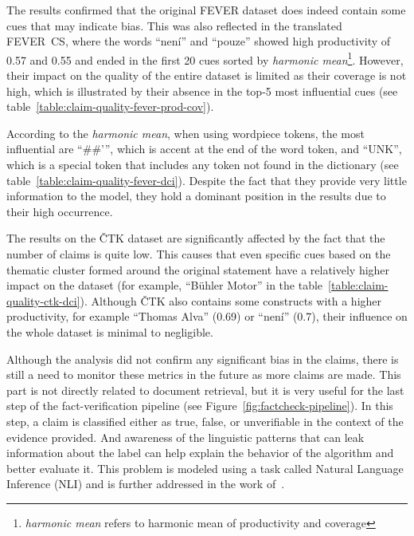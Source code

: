     The results confirmed that the original FEVER dataset does indeed contain some cues that may indicate bias. This was also reflected in the translated FEVER~CS, where the words \enquote{není} and \enquote{pouze} showed high productivity of 0.57 and 0.55 and ended in the first 20 cues sorted by \emph{harmonic mean}\footnote{\emph{harmonic mean} refers to harmonic mean of productivity and coverage}. However, their impact on the quality of the entire dataset is limited as their coverage is not high, which is illustrated by their absence in the top-5 most influential cues (see table~\ref{table:claim-quality-fever-prod-cov}).
    
    According to the \emph{harmonic mean}, when using wordpiece tokens, the most influential are \enquote{\#\#'}, which is accent at the end of the word token, and \enquote{UNK}, which is a special token that includes any token not found in the dictionary (see table~\ref{table:claim-quality-fever-dci}). Despite the fact that they provide very little information to the model, they hold a dominant position in the results due to their high occurrence.
    
    The results on the ČTK dataset are significantly affected by the fact that the number of claims is quite low. This causes that even specific cues based on the thematic cluster formed around the original statement have a relatively higher impact on the dataset (for example, \enquote{Bühler Motor} in the table~\ref{table:claim-quality-ctk-dci}). Although ČTK also contains some constructs with a higher productivity, for example \enquote{Thomas Alva} (0.69) or \enquote{není} (0.7), their influence on the whole dataset is minimal to negligible.
    
    Although the analysis did not confirm any significant bias in the claims, there is still a need to monitor these metrics in the future as more claims are made. This part is not directly related to document retrieval, but it is very useful for the last step of the fact-verification pipeline (see Figure~\ref{fig:factcheck-pipeline}). In this step, a claim is classified either as true, false, or unverifiable in the context of the evidence provided. And awareness of the linguistic patterns that can leak information about the label can help explain the behavior of the algorithm and better evaluate it. This problem is modeled using a task called Natural Language Inference (NLI) and is further addressed in the work of~\parencite{herbert-mt}.
    
